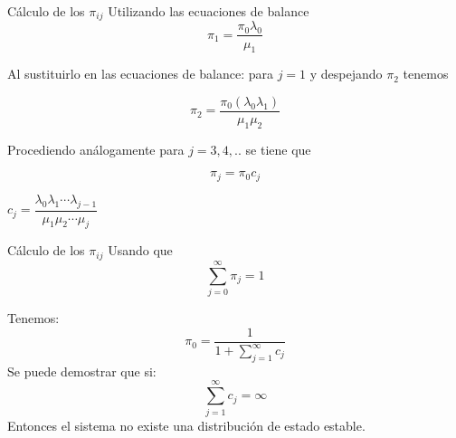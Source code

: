 \begin{frame}{Cálculo de los $\pi_{ij}$}
	Utilizando las ecuaciones de balance 
	\begin{equation*}
	\pi_1=\frac{\pi_0 \lambda_0}{\mu_1}
	\label{eq3}
	\end{equation*}
	
	\pause
	Al sustituirlo en las ecuaciones de balance: para $j=1$ y despejando $\pi_2$ tenemos
	
	\begin{equation*}
	\pi_2=\frac{\pi_0(\lambda_0 \lambda_1)}{\mu_1 \mu_2}
	\label{eq4}
	\end{equation*}
	
	\pause
	Procediendo análogamente para $j=3,4,..$ se tiene que
	
	\begin{equation*}
	\pi_j=\pi_0 c_j
	\label{eq5}
	\end{equation*}
	
	$c_j=\dfrac{\lambda_0 \lambda_1 \cdots \lambda_{j-1}}{\mu_1 \mu_2 \cdots \mu_j}$
\end{frame}

\begin{frame}{Cálculo de los $\pi_{ij}$}
	Usando que \begin{equation*}
	\sum_{j=0}^{\infty}\pi_j=1 
	\label{eq6}
	\end{equation*}
	
	\pause
	Tenemos:
	\begin{equation*}
	\pi_0=\dfrac{1}{1+\sum_{j=1}^{\infty} c_j}
	\label{eq6}
	\end{equation*}
	\pause
	Se puede demostrar que si:
	$$
	\sum_{j=1}^{\infty} c_j = \infty $$
	Entonces el sistema no existe una distribución de estado estable.
\end{frame}
